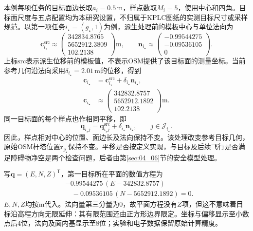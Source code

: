 本例每项任务的目标面边长取$a_i=0.5\,\mathrm m$，样点数取$M_i=5$，使用中心和四角。目标面尺度与五点配置均为本研究设置，不归属于KPLC图纸的实测目标尺寸或采样规范。以第一项任务$i_\star=(g_\star,1)$为例，派生处理前的模板中心与单位法向为
\begin{equation}
 \mathbf c_{i_\star}^{\mathrm{src}}\approx
 \begin{pmatrix}
 342834.8765\\
 5652912.3809\\
 102.2138
 \end{pmatrix}\mathrm m,
 \qquad
 \mathbf n_{i_\star}\approx
 \begin{pmatrix}
 -0.99544275\\
 -0.09536105\\
 0
 \end{pmatrix}.
\end{equation}
上标$\mathrm{src}$表示派生位移前的模板值，不表示OSM提供了该目标面的测量坐标。当前参考几何沿法向采用$\delta_{i_\star}=2.01\,\mathrm m$的位移，得到
\begin{align}
 \mathbf c_{i_\star}
 &=\mathbf c_{i_\star}^{\mathrm{src}}
   +\delta_{i_\star}\mathbf n_{i_\star},\\
 \mathbf c_{i_\star}&\approx
 \begin{pmatrix}
 342832.8757\\
 5652912.1892\\
 102.2138
 \end{pmatrix}\mathrm m.
\end{align}
同一目标面的每个样点也作相同平移，即
\begin{equation}
 \mathbf q_{i_\star j}
 =\mathbf q_{i_\star j}^{\mathrm{src}}
  +\delta_{i_\star}\mathbf n_{i_\star},
 \qquad j\in\mathcal J_{i_\star}.
\end{equation}
因此，样点相对中心的位置、面边长及法向保持不变。该处理改变参考目标几何，原始OSM杆塔位置$\mathbf r_{g_\star}$保持不变。平移是否按定义实现，与目标及后续飞行是否满足障碍物净空是两个检查问题，后者由第\ref{sec:04_06}节的安全模型处理。

写$\mathbf q=(E,N,Z)^{\mathsf T}$，第一目标所在平面的数值方程为
\begin{equation}
 \begin{split}
 &-0.99544275\,(E-342832.8757)\\
 &\quad-0.09536105\,(N-5652912.1892)=0.
 \end{split}
\end{equation}
$E,N,Z$均按$\mathrm m$代入。法向量第三分量为0，故平面方程没有$Z$项，但这不意味着目标沿高程方向无限延伸：其有限范围还由正方形边界限定。坐标与偏移显示至小数点后4位，法向及面内基显示至8位；实验和电子数据保留原始计算精度。

